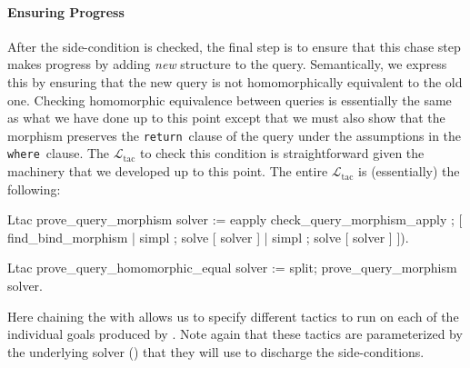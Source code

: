\documentclass{sigplanconf}
\newcommand{\WHERE}{{\tt where}\relax\ifmmode\ \else\xspace\fi}
\newcommand{\RETURN}{{\tt return}\relax\ifmmode\ \else\xspace\fi}
\newcommand{\ltac}[0]{\ensuremath{\mathcal{L}_{\mathrm{tac}}}}
\begin{document}
\paragraph{Ensuring Progress}
After the side-condition is checked, the final step is to ensure that this chase step makes progress by adding \emph{new} structure to the query.
Semantically, we express this by ensuring that the new query is not homomorphically equivalent to the old one.
Checking homomorphic equivalence between queries is essentially the same as what we have done up to this point except that we must also show that the morphism preserves the \RETURN clause of the query under the assumptions in the \WHERE clause.
The \ltac{} to check this condition is straightforward given the machinery that we developed up to this point.
The entire \ltac{} is (essentially) the following:
\begin{coq}
Ltac prove_query_morphism solver :=
  eapply check_query_morphism_apply ;
    [ find_bind_morphism
    | simpl ; solve [ solver ]
    | simpl ; solve [ solver ] ]).

Ltac prove_query_homomorphic_equal solver :=
  split; prove_query_morphism solver.
\end{coq}
Here chaining the  with \coqe{; [ a | b | c ]} allows us to specify different tactics to run on each of the individual goals produced by .
Note again that these tactics are parameterized by the underlying solver () that they will use to discharge the side-conditions.
\end{document}
